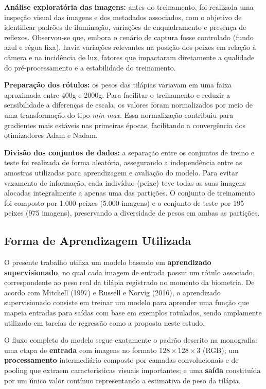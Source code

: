 \documentclass[sigconf,nonacm,screen]{acmart}
\begin{document}
\textbf{Análise exploratória das imagens:} antes do treinamento, foi realizada uma inspeção visual das imagens e dos metadados associados, com o objetivo de identificar padrões de iluminação, variações de enquadramento e presença de reflexos. Observou-se que, embora o cenário de captura fosse controlado (fundo azul e régua fixa), havia variações relevantes na posição dos peixes em relação à câmera e na incidência de luz, fatores que impactaram diretamente a qualidade do pré-processamento e a estabilidade do treinamento.

\textbf{Preparação dos rótulos:} os pesos das tilápias variavam em uma faixa aproximada entre 400g e 2000g. Para facilitar o treinamento e reduzir a sensibilidade a diferenças de escala, os valores foram normalizados por meio de uma transformação do tipo \textit{min-max}. Essa normalização contribuiu para gradientes mais estáveis nas primeiras épocas, facilitando a convergência dos otimizadores Adam e Nadam.

\textbf{Divisão dos conjuntos de dados:} a separação entre os conjuntos de treino e teste foi realizada de forma aleatória, assegurando a independência entre as amostras utilizadas para aprendizagem e avaliação do modelo. Para evitar vazamento de informação, cada indivíduo (peixe) teve todas as suas imagens alocadas integralmente a apenas uma das partições. O conjunto de treinamento foi composto por 1.000 peixes (5.000 imagens) e o conjunto de teste por 195 peixes (975 imagens), preservando a diversidade de pesos em ambas as partições.

\subsection{Forma de Aprendizagem Utilizada}

O presente trabalho utiliza um modelo baseado em \textbf{aprendizado supervisionado}, no qual cada imagem de entrada possui um rótulo associado, correspondente ao peso real da tilápia registrado no momento da biometria. De acordo com Mitchell (1997) e Russell e Norvig (2016), o aprendizado supervisionado consiste em treinar um modelo para aprender uma função que mapeia entradas para saídas com base em exemplos rotulados, sendo amplamente utilizado em tarefas de regressão como a proposta neste estudo.

O fluxo completo do modelo segue exatamente o padrão descrito na monografia: uma etapa de \textbf{entrada} com imagens no formato $128 \times 128 \times 3$ (RGB); um \textbf{processamento} intermediário composto por camadas convolucionais e de pooling que extraem características visuais importantes; e uma \textbf{saída} constituída por um único valor contínuo representando a estimativa de peso da tilápia.
\end{document}
